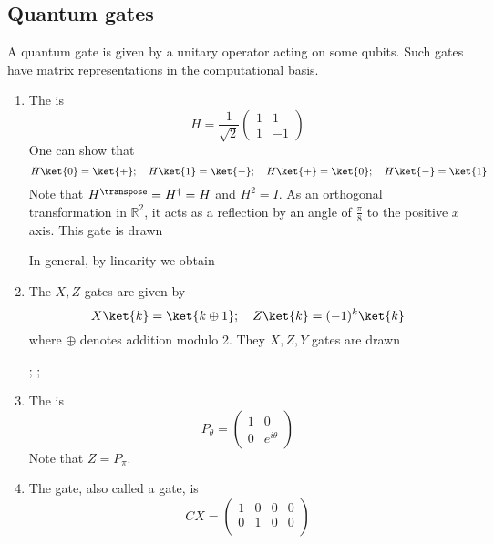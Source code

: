 \subsection{Quantum gates}
A quantum gate is given by a unitary operator acting on some qubits.
Such gates have matrix representations in the computational basis.
\begin{enumerate}
    \item The  is
    \[ H = \frac{1}{\sqrt{2}} \begin{pmatrix}
        1 & 1 \\
        1 & -1
    \end{pmatrix} \]
    One can show that
    \[ H \ket{0} = \ket{+};\quad H\ket{1} = \ket{-};\quad H\ket{+} = \ket{0};\quad H\ket{-} = \ket{1} \]
    Note that $H^\transpose = H^\dagger = H$ and $H^2 = I$.
    As an orthogonal transformation in $\mathbb R^2$, it acts as a reflection by an angle of $\frac{\pi}{8}$ to the positive $x$ axis.
    This gate is drawn
    \begin{center}
        \leavevmode
    \end{center}
    In general, by linearity we obtain
    \begin{center}
        \leavevmode
    \end{center}
    \item The $X, Z$ gates are given by
    \[ X \ket{k} = \ket{k \oplus 1};\quad Z \ket{k} = (-1)^k \ket{k} \]
    where $\oplus$ denotes addition modulo 2.
    They $X, Z, Y$ gates are drawn
    \begin{center}
        \leavevmode
        ;\quad
        ;\quad
    \end{center}
    \item The  is
    \[ P_\theta = \begin{pmatrix}
        1 & 0 \\
        0 & e^{i\theta}
    \end{pmatrix} \]
    Note that $Z = P_\pi$.
    \item The  gate, also called a  gate, is
    \[ CX = \begin{pmatrix}
        1 & 0 & 0 & 0 \\
        0 & 1 & 0 & 0 \\

\end{pmatrix}\]
\end{enumerate}
